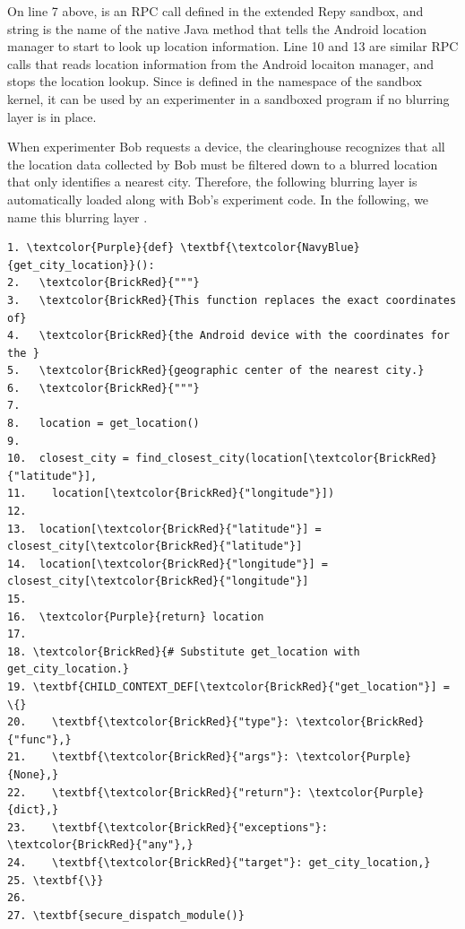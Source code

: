 On line 7 above,  is an RPC call defined in the extended 
Repy sandbox, 
and string  is the name of the native Java method that tells the Android 
location manager to start to look up location information. Line 10 and 13 are similar RPC 
calls that reads location information from the Android locaiton manager, and stops the location 
lookup. Since  is defined in the namespace of the sandbox kernel, it can 
be used by an experimenter in a sandboxed program if no blurring layer is in place.

When experimenter Bob requests a device, the clearinghouse recognizes that all the location data
collected by Bob must be filtered down to a blurred location that only identifies a nearest city.
Therefore, the following blurring layer is
automatically loaded along with Bob's experiment code. In the following, we name this
blurring layer .

\begin{Verbatim}
1. \textcolor{Purple}{def} \textbf{\textcolor{NavyBlue}{get_city_location}}():
2.   \textcolor{BrickRed}{"""}
3.   \textcolor{BrickRed}{This function replaces the exact coordinates of} 
4.   \textcolor{BrickRed}{the Android device with the coordinates for the } 
5.   \textcolor{BrickRed}{geographic center of the nearest city.}
6.   \textcolor{BrickRed}{"""}
7.
8.   location = get_location()
9.
10.  closest_city = find_closest_city(location[\textcolor{BrickRed}{"latitude"}],
11.    location[\textcolor{BrickRed}{"longitude"}])
12.
13.  location[\textcolor{BrickRed}{"latitude"}] = closest_city[\textcolor{BrickRed}{"latitude"}]
14.  location[\textcolor{BrickRed}{"longitude"}] = closest_city[\textcolor{BrickRed}{"longitude"}]
15.
16.  \textcolor{Purple}{return} location
17.
18. \textcolor{BrickRed}{# Substitute get_location with get_city_location.}
19. \textbf{CHILD_CONTEXT_DEF[\textcolor{BrickRed}{"get_location"}] = \{}
20.    \textbf{\textcolor{BrickRed}{"type"}: \textcolor{BrickRed}{"func"},}
21.    \textbf{\textcolor{BrickRed}{"args"}: \textcolor{Purple}{None},}
22.    \textbf{\textcolor{BrickRed}{"return"}: \textcolor{Purple}{dict},}
23.    \textbf{\textcolor{BrickRed}{"exceptions"}: \textcolor{BrickRed}{"any"},}
24.    \textbf{\textcolor{BrickRed}{"target"}: get_city_location,}
25. \textbf{\}}
26.
27. \textbf{secure_dispatch_module()}
\end{Verbatim}


